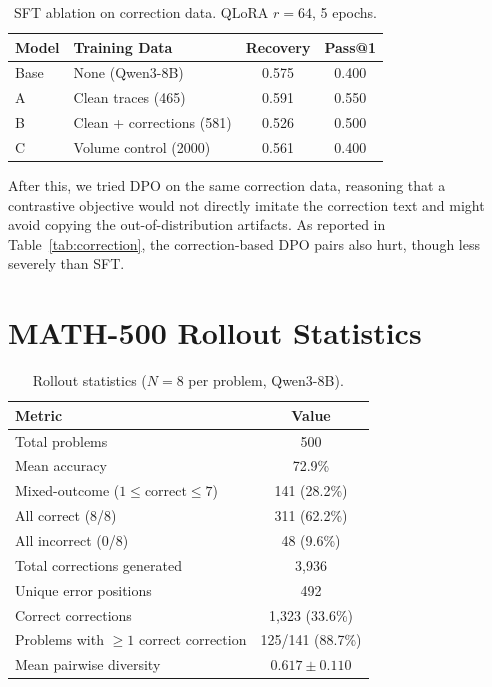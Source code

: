 \documentclass{article}
\begin{document}
\begin{table}[h]
    \centering
    \caption{SFT ablation on correction data. QLoRA $r{=}64$, 5 epochs.}
    \vspace{0.5em}
    \begin{tabular}{llcc}
        \toprule
        Model & Training Data & Recovery & Pass@1 \\
        \midrule
        Base & None (Qwen3-8B) & 0.575 & 0.400 \\
        A & Clean traces (465) & 0.591 & 0.550 \\
        B & Clean + corrections (581) & 0.526 & 0.500 \\
        C & Volume control (2000) & 0.561 & 0.400 \\
        \bottomrule
    \end{tabular}
    \label{tab:sft}
\end{table}

After this, we tried DPO on the same correction data, reasoning that a contrastive objective would not directly imitate the correction text and might avoid copying the out-of-distribution artifacts.
As reported in Table~\ref{tab:correction}, the correction-based DPO pairs also hurt, though less severely than SFT.

\section{MATH-500 Rollout Statistics}
\label{app:stats}

\begin{table}[h]
    \centering
    \caption{Rollout statistics ($N = 8$ per problem, Qwen3-8B).}
    \vspace{0.5em}
    \begin{tabular}{lc}
        \toprule
        Metric & Value \\
        \midrule
        Total problems & 500 \\
        Mean accuracy & 72.9\% \\
        Mixed-outcome ($1 \leq \text{correct} \leq 7$) & 141 (28.2\%) \\
        All correct (8/8) & 311 (62.2\%) \\
        All incorrect (0/8) & 48 (9.6\%) \\
        Total corrections generated & 3,936 \\
        Unique error positions & 492 \\
        Correct corrections & 1,323 (33.6\%) \\
        Problems with $\geq 1$ correct correction & 125/141 (88.7\%) \\
        Mean pairwise diversity & $0.617 \pm 0.110$ \\
        \bottomrule
    \end{tabular}
    \label{tab:rollout_stats}
\end{table}



\end{document}
